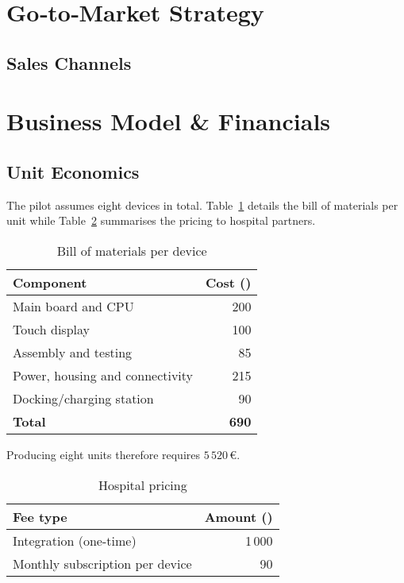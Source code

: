 \documentclass[a4paper,11pt]{article}
\begin{document}
\section{Go‐to‐Market Strategy}
\subsection{Sales Channels}



\section{Business Model \& Financials}
\subsection{Unit Economics}
The pilot assumes eight devices in total. Table~\ref{tab:bom} details the bill of materials per unit while Table~\ref{tab:pricing} summarises the pricing to hospital partners.

\begin{table}[H]
\centering
\caption{Bill of materials per device}
\label{tab:bom}
\begin{tabularx}{\linewidth}{l r}
\toprule
Component & Cost (\texteuro{}) \\
\midrule
Main board and CPU & 200 \\
Touch display & 100 \\
Assembly and testing & 85 \\
Power, housing and connectivity & 215 \\
Docking/charging station & 90 \\
\midrule
\textbf{Total} & \textbf{690} \\
\bottomrule
\end{tabularx}
\end{table}

Producing eight units therefore requires \(5\,520\,\text{€}\).

\begin{table}[H]
\centering
\caption{Hospital pricing}
\label{tab:pricing}
\begin{tabularx}{\linewidth}{l r}
\toprule
Fee type & Amount (\texteuro{}) \\
\midrule
Integration (one-time) & 1\,000 \\
Monthly subscription per device & 90 \\
\bottomrule
\end{tabularx}
\end{table}
\end{document}
